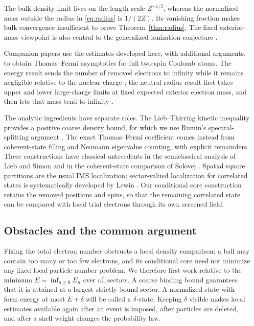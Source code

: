 The bulk density limit lives on the length
scale $Z^{-1/3}$, whereas the normalized mass outside the radius in
\eqref{eq:radius} is $1/(2Z)$. Its vanishing fraction makes bulk convergence
insufficient to prove Theorem~\ref{thm:radius}. The fixed exterior-mass
viewpoint is also central to the generalized ionization conjecture
\citep[Section~3]{Solovej2016}.

Companion papers use the estimates developed here, with additional arguments,
to obtain Thomas--Fermi asymptotics for full two-spin Coulomb atoms.
The energy result sends the number of removed electrons to infinity while
it remains negligible relative to the nuclear charge
\citep[Theorem~1.1]{OpenAI2026GeneralizedEnergy}; the neutral-radius result
first takes upper and lower large-charge limits at fixed expected exterior
electron mass, and then lets that mass tend to infinity
\citep[Theorem~1.1]{OpenAI2026GeneralizedRadius}.

The analytic ingredients have separate roles. The Lieb--Thirring kinetic
inequality provides a positive coarse density bound, for which we use
Rumin's spectral-splitting argument
\citep{LiebThirring1975,Rumin2011}. The exact Thomas--Fermi coefficient
comes instead from coherent-state filling and Neumann eigenvalue counting,
with explicit remainders. These constructions have classical antecedents
in the semiclassical analysis of Lieb and Simon and in the coherent-state
comparison of Solovej
\citep[Theorems~III.10--III.13]{LiebSimon1977}
\citep[Lemma~8.2]{Solovej2003}. Spatial square partitions are the usual
IMS localization; sector-valued localization for correlated states is
systematically developed by Lewin \citep[Proposition~3.1 and Example~3.3]{Lewin2011Geometric}.
Our conditional core construction retains the removed positions and spins,
so that the remaining correlated state can be compared with local trial
electrons through its own screened field.

\subsection{Obstacles and the common argument}

Fixing the total electron number obstructs a local density comparison:
a ball may contain too many or too few electrons, and its conditional core
need not minimize any fixed local-particle-number problem. We therefore
first work relative to the minimum $E=\inf_{n\ge0}E_n$ over all sectors.
A coarse binding bound guarantees that it is attained at a largest
strictly bound sector. A normalized state with form energy at most
$E+\delta$ will be called a $\delta$-state. Keeping $\delta$ visible makes
local estimates available again after an event is imposed, after particles
are deleted, and after a shell weight changes the probability law.

